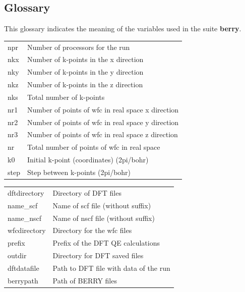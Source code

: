 \documentclass[a4paper,12pt]{report}
\begin{document}
\begin{appendices}



\chapter{Glossary}

This glossary indicates the meaning of the variables used in the suite \textbf{berry}.
\vspace{0.5cm}

\begin{tabularx}{\textwidth}{Xl}
 npr            & Number of processors for the run \\

 nkx            & Number of k-points in the x direction \\
 nky            & Number of k-points in the y direction \\
 nkz            & Number of k-points in the z direction \\
 nks            & Total number of k-points \\

 nr1            & Number of points of wfc in real space x direction \\
 nr2            & Number of points of wfc in real space y direction \\
 nr3            & Number of points of wfc in real space z direction \\
 nr             & Total number of points of wfc in real space \\

 k0             & Initial k-point (coordinates) (2pi/bohr) \\
 step           & Step between k-points (2pi/bohr) \\
\end{tabularx}
\vspace{0.5cm}

\begin{tabularx}{\textwidth}{Xl}
 dftdirectory   & Directory of DFT files \\
 name\_scf       & Name of scf file (without suffix) \\
 name\_nscf      & Name of nscf file (without suffix) \\
 wfcdirectory   & Directory for the wfc files \\
 prefix         & Prefix of the DFT QE calculations \\
 outdir         & Directory for DFT saved files \\
 dftdatafile    & Path to DFT file with data of the run \\
 berrypath      & Path of BERRY files \\
\end{tabularx}
\vspace{0.5cm}


\end{appendices}
\end{document}
